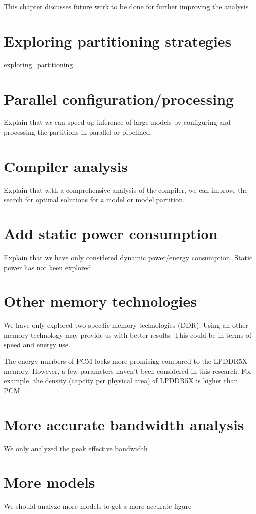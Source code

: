 This chapter discusses future work to be done for further improving the analysis

\section{Exploring partitioning strategies}
{exploring_partitioning}

\section{Parallel configuration/processing}
Explain that we can speed up inference of large models by configuring and processing the partitions in parallel or pipelined.

\section{Compiler analysis}
Explain that with a comprehensive analysis of the compiler, we can improve the search for optimal solutions for a model or model partition.

\section{Add static power consumption}
Explain that we have only considered dynamic power/energy consumption.
Static power has not been explored.

\section{Other memory technologies}
We have only explored two specific memory technologies (DDR).
Using an other memory technology may provide us with better results.
This could be in terms of speed and energy use.

The energy numbers of PCM looks more promising compared to the LPDDR5X memory.
However, a few parameters haven't been considered in this research.
For example, the density (capcity per physical area) of LPDDR5X is higher than PCM.

\section{More accurate bandwidth analysis}
We only analyzed the peak effective bandwidth

\section{More models}
We should analyze more models to get a more accurate figure

